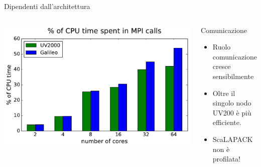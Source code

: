 \documentclass[8pt]{beamer}
\begin{document}
\begin{frame}{Dipendenti dall'architettura}
\begin{columns}
		\begin{center}			
			\vspace{-1cm}
			\includegraphics[width=1\textwidth]{arch_mpi_perc.pdf}			
		\end{center}
		\begin{overlayarea}{\linewidth}{\textheight}
		\begin{block}{Comunicazione}
			\begin{itemize}
				\item<1-> Ruolo comunicazione cresce sensibilmente
				\item<2-> Oltre il singolo nodo UV200 \`e pi\`u efficiente.
				\item<3-> ScaLAPACK non \`e profilata!
			\end{itemize}		
		\end{block}

		\end{overlayarea}
\end{columns}

\end{frame}
\end{document}
